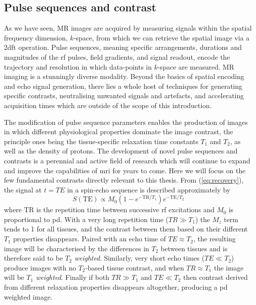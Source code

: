 \subsection{Pulse sequences and contrast}

As we have seen, MR images are acquired by measuring signals within the spatial frequency dimension, $k$-space, from which we can retrieve the spatial image via a \gls{2dft} operation.
Pulse sequences, meaning specific arrangements, durations and magnitudes of the \gls{rf} pulses, field gradients, and signal readout, encode the trajectory and resolution in which data-points in $k$-space are measured.
MR imaging is a stunningly diverse modality.
Beyond the basics of spatial encoding and echo signal generation, there lies a whole host of techniques for generating specific contrasts, neutralising unwanted signals and artefacts, and accelerating acquisition times which are outside of the scope of this introduction.

The modification of pulse sequence parameters enables the production of images in which different physiological properties dominate the image contrast, the principle ones being the tissue-specific relaxation time constants $T_1$ and $T_2$, as well as the density of protons.
The development of novel pulse sequences and contrasts is a perennial and active field of research which will continue to expand and improve the capabilities of \gls{mri} for years to come.
Here we will focus on the few fundamental contrasts directly relevant to this thesis.
From (\ref{eq:recovery}), the signal at $t=TE$ in a spin-echo sequence is described approximately by
\begin{equation}
  S(\text{TE}) \propto M_0 (1-e^{-\text{TR}/T_1})e^{-\text{TE}/T_2}
\end{equation}
where TR is the repetition time between successive \gls{rf} excitations and $M_0$ is proportional to \gls{pd}.
With a very long repetition time ($TR\gg T_1$) the $M_z$ term tends to 1 for all tissues, and the contrast between them based on their different $T_1$ properties disappears.
Paired with an echo time of $TE\approx T_2$, the resulting image will be characterised by the differences in $T_2$ between tissues and is therefore said to be \textit{$T_2$ weighted}.
Similarly, very short echo times ($TE\ll T_2$) produce images with no $T_2$-based tissue contrast, and when $TR\approx T_1$ the image will be \textit{$T_1$ weighted}.
Finally if both $TR\gg T_1$ and $TE\ll T_2$ then contrast derived from different relaxation properties disappears altogether, producing a \gls{pd} weighted image.

